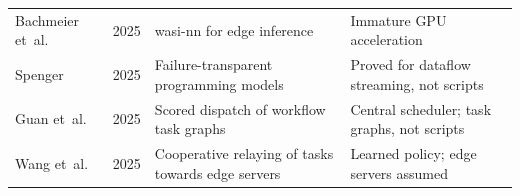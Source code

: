 {\begin{longtable}{L{2.8cm} C{0.75cm} L{4.85cm} L{4.85cm}}
Bachmeier et~al.\ \cite{bachmeier2025} & 2025 & wasi-nn for edge inference & Immature GPU acceleration \\
Spenger \cite{kth2025thesis} & 2025 & Failure-transparent programming models & Proved for dataflow streaming, not scripts \\
Guan et~al.\ \cite{idds2025} & 2025 & Scored dispatch of workflow task graphs & Central scheduler; task graphs, not scripts \\
Wang et~al.\ \cite{adhoc2025} & 2025 & Cooperative relaying of tasks towards edge servers & Learned policy; edge servers assumed \\
\end{longtable}}
